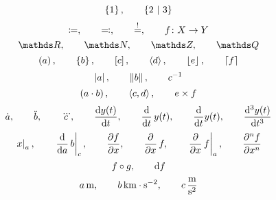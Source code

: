 \documentclass[a4paper,fleqn, 11pt]{article}
\begin{document}
  \[
    \set{1}{}
    \separate
    \set{2}{3}
  \]
  \[
    \coloneqq
    ,\qquad
    \eqqcolon
    ,\qquad
    \stackrel{!}{=}
    ,\qquad
    f\colon X\to Y
  \]
  \[
    \setReal
    \separate
    \setNatural
    \separate
    \setInteger
    \separate
    \setRational
  \]
  \[
    \left( a \right)
    ,\qquad
    \left\{ b \right\}
    ,\qquad
    \left[ c \right]
    ,\qquad
    \left\langle d \right\rangle
    ,\qquad
    \left\lfloor e \right\rfloor
    ,\qquad
    \left\lceil f \right\rceil
  \]
  \[
    \left| a \right|
    ,\qquad
    \left\| b \right\|
    ,\qquad
    {c}^{-1}
  \]
  \[
    \left( a\cdot b \right)
    ,\qquad
    \left\langle c,d \right\rangle
    ,\qquad
    e \times f
  \]
  \[
    \timeDerivative{a}
    \separate
    \timeSecondDerivative{b}
    \separate
    \timeThirdDerivative{c}
    \separate
    \leibnizDerivative{y(t)}{t}
    \separate
    \leibnizDerivativeOperator{t}{y(t)}
    \separate
    \leibnizDerivativeOperator{t}{}y(t)
    \separate
    \leibnizDerivative[3]{y(t)}{t}
  \]
  \[
    \appendValue{x}{a}
    \separate
    \leibnizDerivativeOperatorValue{a}{b}{c}
    \separate
    \leibnizPartialDerivative{f}{x}
    \separate
    \leibnizPartialDerivativeOperator{x}{f}
    \separate
    \leibnizPartialDerivativeOperatorValue{x}{f}{a}
    \separate
    \leibnizPartialDerivative[n]{f}{x}
  \]
  \[
    f\circ g
    ,\qquad
    \mathrm{d} f
  \]
  \[
    a\, \mathrm{m}
    ,\qquad
    b\, \mathrm{km\cdot s^{-2}}
    ,\qquad
    c\, \mathrm{\frac{m}{s^2}}
  \]
\end{document}
